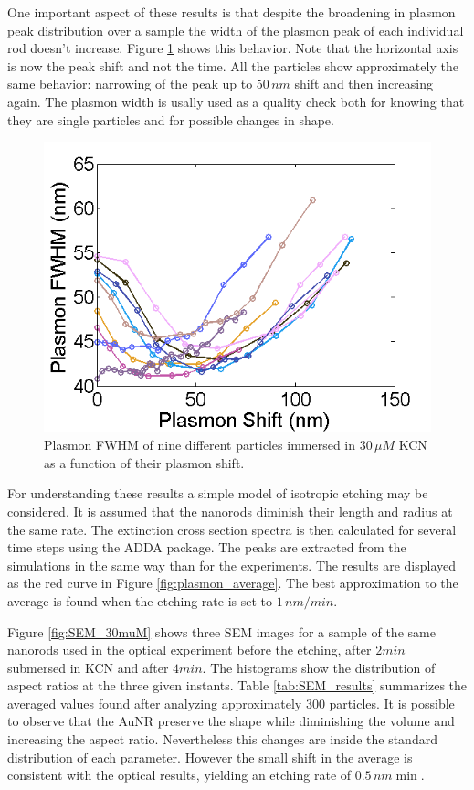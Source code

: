 \documentclass[twocolumn]{article}
\begin{document}
One important aspect of these results is that despite the broadening in plasmon
peak distribution over a sample the width of the plasmon peak of each individual
rod doesn't increase. Figure \ref{fig:FWHM} shows this behavior. Note that the
horizontal axis is now the peak shift and not the time. All the particles show
approximately the same behavior: narrowing of the peak up to $50\,nm$ shift and
then increasing again. The plasmon width is usally used as a quality check both
for knowing that they are single particles and for possible changes in shape.

\begin{figure}[hbt]
 \centering
 \includegraphics[width=0.95\linewidth]{fwhm_several.png}
 \caption{Plasmon FWHM of nine different particles immersed in $30\,\mu M$ KCN
 as a function of their plasmon shift.}
 \label{fig:FWHM}
\end{figure}

For understanding these results a simple model of isotropic etching may be
considered. It is assumed that the nanorods diminish their length and radius at
the same rate. The extinction cross section spectra is then calculated for
several time steps using the ADDA package. The peaks are extracted from the
simulations in the same way than for the experiments. The results are displayed
as the red curve in Figure \ref{fig:plasmon_average}. The best approximation to
the average is found when the etching rate is set to $1\,nm/min$.

Figure \ref{fig:SEM_30muM} shows three SEM images for a sample of the same
nanorods used in the optical experiment before the etching, after $2min$
submersed in KCN and after $4min$. The histograms show the distribution of
aspect ratios at the three given instants. Table \ref{tab:SEM_results}
summarizes the averaged values found after analyzing approximately $300$
particles. It is possible to observe that the AuNR preserve the shape while
diminishing the volume and increasing the aspect ratio. Nevertheless this
changes are inside the standard distribution of each parameter. However the
small shift in the average is consistent with the optical results, yielding an
etching rate of $0.5\,nm\min$.
\end{document}
